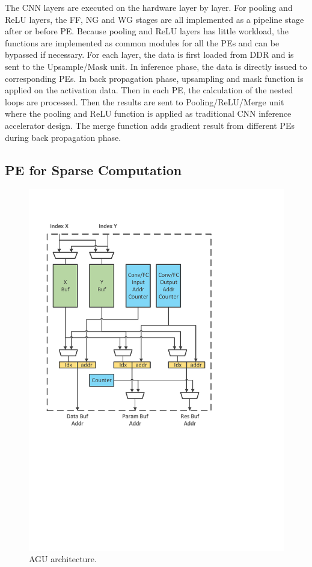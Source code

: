 The CNN layers are executed on the hardware layer by layer. For pooling and ReLU layers, the FF, NG and WG stages are all implemented as a pipeline stage after or before PE. Because pooling and ReLU layers has little workload, the functions are implemented as common modules for all the PEs and can be bypassed if necessary. For each layer, the data is first loaded from DDR and is sent to the Upsample/Mask unit. In inference phase, the data is directly issued to corresponding PEs. In back propagation phase, upsampling and mask function is applied on the activation data. Then in each PE, the calculation of the nested loops are processed. Then the results are sent to Pooling/ReLU/Merge unit where the pooling and ReLU function is applied as traditional CNN inference accelerator design. The merge function adds gradient result from different PEs during back propagation phase.

\subsection{PE for Sparse Computation}\label{sec:hw_pe}

\begin{figure}[htb]
  \centering
  \includegraphics[width=1.0\columnwidth]{figures/agu.pdf}
  \caption{AGU architecture.}
  \label{fig:agu}
\end{figure}

